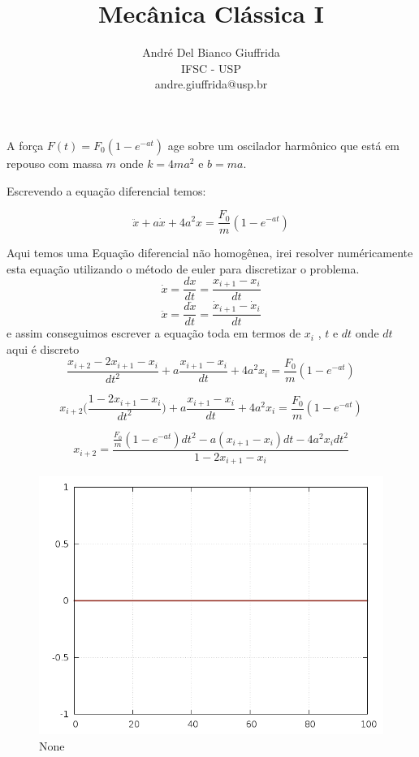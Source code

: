 \documentclass[a4paper,12pt]{article}
\title{ Mecânica Clássica I}
\author{\small André Del Bianco Giuffrida\\ \small IFSC - USP\\ \small andre.giuffrida@usp.br}
\date{}
\begin{document}
\maketitle
	A força $F(t) = F_0 (1-e^{-a t})$ age sobre um oscilador harmônico que está em repouso com massa $m$ onde $k=4ma^2$ e $b = ma$.
	
	Escrevendo a equação diferencial temos:
	
	\[ \ddot{x} + a\dot{x} + 4a^2 x = \frac{F_0}{m} (1-e^{-a t}) \]
	
	Aqui temos uma Equação diferencial não homogênea, irei resolver numéricamente esta equação utilizando o método de euler para discretizar o problema.
	\[ \dot{x} = \frac{dx}{dt} = \frac{ x_{i+1} - x_{i} }{dt} \]
	\[ \ddot{x} = \frac{d\dot{x}}{dt} = \frac{ \dot{x}_{i+1} - \dot{x}_{i} }{dt} \]
	e assim conseguimos escrever a equação toda em termos de $x_i$ , $t$ e $dt$
	onde $dt$ aqui é discreto
	\[ \frac{ x_{i+2} - 2x_{i+1}- x_{i} }{dt^2} + a\frac{ x_{i+1} - x_{i} }{dt} + 4a^2 x_{i} = \frac{F_0}{m} (1-e^{-a t}) \]
	
	\[ x_{i+2} \Big(\frac{ 1 - 2x_{i+1}- x_{i} }{dt^2} \Big) + a\frac{ x_{i+1} - x_{i} }{dt} + 4a^2 x_{i}  = \frac{F_0}{m} (1-e^{-a t}) \]
	
	\[ x_{i+2} = \frac{\frac{F_0}{m} (1-e^{-a t})dt^2 - a (x_{i+1} - x_{i}) dt -  4a^2 x_{i} dt^2}{1 - 2x_{i+1}- x_{i}}\]


	
	\begin{figure}[h]
		\centering
		\includegraphics[scale=0.6]{10o0.png}
		\caption{None}
	\end{figure}
	
	
\end{document}
